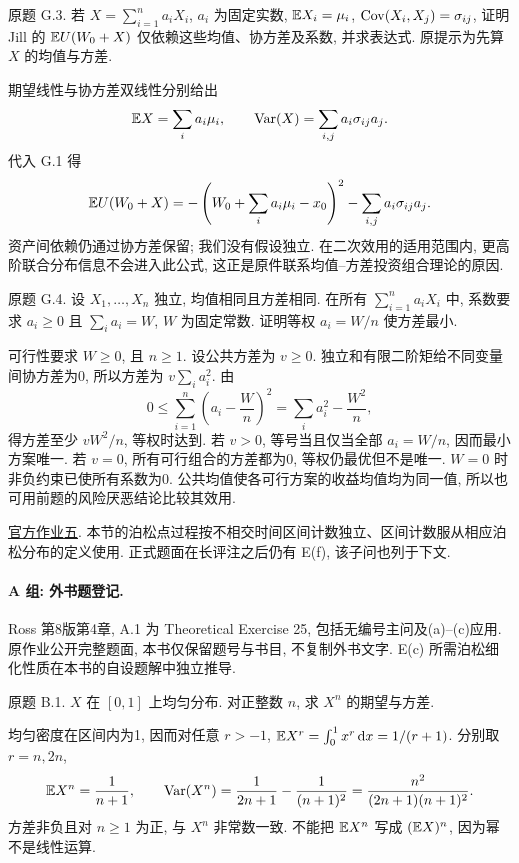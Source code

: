 \begin{exercise}\label{ps4-g3}
原题 G.3. 若 $X=\sum_{i=1}^na_iX_i$, $a_i$ 为固定实数, $\mathbb E X_i=\mu_i$, $\operatorname{Cov}(X_i,X_j)=\sigma_{ij}$, 证明 Jill 的 $\mathbb E U(W_0+X)$ 仅依赖这些均值、协方差及系数, 并求表达式. 原提示为先算 $X$ 的均值与方差.
\end{exercise}
\begin{solution}
期望线性与协方差双线性分别给出
\[
\mathbb E X=\sum_i a_i\mu_i,\qquad \operatorname{Var}(X)=\sum_{i,j}a_i\sigma_{ij}a_j.
\]
代入 G.1 得
\[
\mathbb E U(W_0+X)
=-\left(W_0+\sum_i a_i\mu_i-x_0\right)^2-\sum_{i,j}a_i\sigma_{ij}a_j.
\]
资产间依赖仍通过协方差保留; 我们没有假设独立. 在二次效用的适用范围内, 更高阶联合分布信息不会进入此公式, 这正是原件联系均值--方差投资组合理论的原因.
\end{solution}

\begin{exercise}\label{ps4-g4}
原题 G.4. 设 $X_1,\ldots,X_n$ 独立, 均值相同且方差相同. 在所有 $\sum_{i=1}^na_iX_i$ 中, 系数要求 $a_i\ge0$ 且 $\sum_i a_i=W$, $W$ 为固定常数. 证明等权 $a_i=W/n$ 使方差最小.
\end{exercise}
\begin{solution}
可行性要求 $W\ge0$, 且 $n\ge1$. 设公共方差为 $v\ge0$. 独立和有限二阶矩给不同变量间协方差为0, 所以方差为 $v\sum_i a_i^2$. 由
\[
0\le\sum_{i=1}^n\left(a_i-\frac Wn\right)^2
=\sum_i a_i^2-\frac{W^2}{n},
\]
得方差至少 $vW^2/n$, 等权时达到. 若 $v>0$, 等号当且仅当全部 $a_i=W/n$, 因而最小方案唯一. 若 $v=0$, 所有可行组合的方差都为0, 等权仍最优但不是唯一. $W=0$ 时非负约束已使所有系数为0. 公共均值使各可行方案的收益均值均为同一值, 所以也可用前题的风险厌恶结论比较其效用.
\end{solution}

\href{https://ocw.mit.edu/courses/18-600-probability-and-random-variables-fall-2019/resources/mit18_600f19_pset5/}{官方作业五}. 本节的泊松点过程按不相交时间区间计数独立、区间计数服从相应泊松分布的定义使用. 正式题面在长评注之后仍有 E(f), 该子问也列于下文.

\paragraph{A 组: 外书题登记.}
Ross 第8版第4章, A.1 为 Theoretical Exercise 25, 包括无编号主问及(a)--(c)应用. 原作业公开完整题面, 本书仅保留题号与书目, 不复制外书文字. E(c) 所需泊松细化性质在本书的自设题解中独立推导.

\begin{exercise}\label{ps5-b1}
原题 B.1. $X$ 在 $[0,1]$ 上均匀分布. 对正整数 $n$, 求 $X^n$ 的期望与方差.
\end{exercise}
\begin{solution}
均匀密度在区间内为1, 因而对任意 $r>-1$, $\mathbb E X^r=\int_0^1x^r\,\mathrm d x=1/(r+1)$. 分别取 $r=n,2n$,
\[
\mathbb E X^n=\frac1{n+1},\qquad
\operatorname{Var}(X^n)=\frac1{2n+1}-\frac1{(n+1)^2}
=\frac{n^2}{(2n+1)(n+1)^2}.
\]
方差非负且对 $n\ge1$ 为正, 与 $X^n$ 非常数一致. 不能把 $\mathbb E X^n$ 写成 $(\mathbb E X)^n$, 因为幂不是线性运算.
\end{solution}

